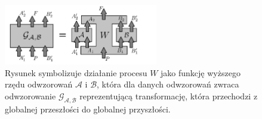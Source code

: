 \documentclass[10pt]{article} %
\begin{document}
\begin{figure}[t]
\centering
\includegraphics[width=0.6\textwidth]{obrazki/done1}
\caption{
Rysunek symbolizuje działanie procesu $W$ jako funkcję wyższego rzędu odwzorowań $\mathcal{A}$ i $\mathcal{B}$, która dla danych odwzorowań zwraca odwzorowanie 
$\mathcal{G_{A,B}}$ reprezentującą transformację, która przechodzi z globalnej przeszłości do globalnej przyszłości.
}
\label{higherordermap}
\end{figure}
\end{document}
